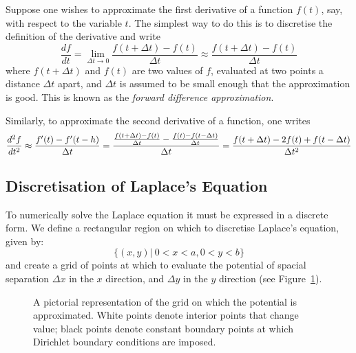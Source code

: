 \documentclass[12pt, a4paper]{article}
\newcommand{\be}{\begin{equation}}
\newcommand{\ee}{\end{equation}}
\begin{document}
Suppose one wishes to approximate the first derivative of a function $f(t)$, say,
with respect to the variable $t$. The simplest way to do this is to discretise the
definition of the derivative and write
%
\be
\frac{df}{dt} = \lim_{\Delta t \to 0} \frac{f(t+\Delta t) - f(t)}{\Delta t} \approx \frac{f(t+\Delta t) - f(t)}{\Delta t}
\ee
%
where $f(t+\Delta t)$ and $f(t)$ are two values of $f$, evaluated at two points
a distance $\Delta t$ apart, and $\Delta t$ is assumed to be small enough that
the approximation is good. This is known as the \emph{forward difference approximation}.

Similarly, to approximate the second derivative of a function, one writes
%
\be
\frac{d^2 f}{dt^2} \approx \frac{f'(t) - f'(t-h)}{\Delta t} \\
= \frac{\frac{f(t +\Delta t) - f(t)}{\Delta t} - \frac{f(t) - f(t -\Delta t)}{\Delta t}}{\Delta t} \\
= \frac{f(t +\Delta t) - 2f(t) + f(t-\Delta t)}{\Delta t ^2}
\ee

\subsection{Discretisation of Laplace's Equation}

To numerically solve the Laplace equation it must be expressed in a discrete form.
We define a rectangular region on which to discretise Laplace's equation, given by:
%
\be
\{(x,y)|\:0<x<a, 0<y<b\}
\ee
%
and create a grid of points at which to evaluate the potential of spacial separation
$\Delta x$ in the $x$ direction, and $\Delta y$ in the $y$ direction (see
Figure~\ref{fig:grid}).

\begin{figure}
\centering
{}
\caption{A pictorial representation of the grid on which the potential is approximated.
White points denote interior points that change value; black points denote constant
boundary points at which Dirichlet boundary conditions are imposed.}
\label{fig:grid}
\end{figure}
\end{document}
